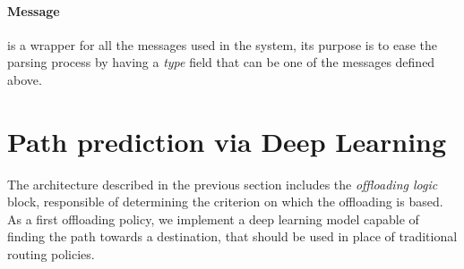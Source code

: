 \paragraph{Message} is a wrapper for all the messages used in the system, its purpose is to ease the parsing process by having a \textit{type} field that can be one of the messages defined above.


\section{Path prediction via Deep Learning}
\label{sec:path_prediction}
The architecture described in the previous section includes the \textit{offloading logic} block, responsible of determining the criterion on which the offloading is based. As a first offloading policy, we implement a deep learning model capable of finding the path towards a destination, that should be used in place of traditional routing policies. 


